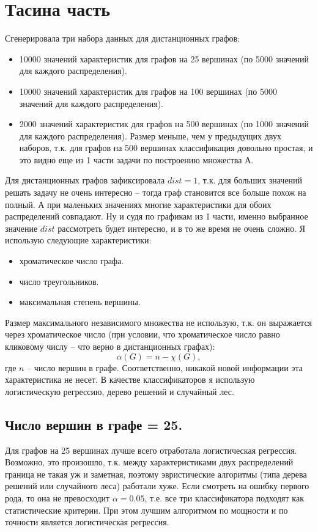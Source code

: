 \documentclass{report}
\begin{document}
\chapter{Тасина часть}
Сгенерировала три набора данных для дистанционных графов:
\begin{itemize}
    \item 10000 значений характеристик для графов на 25 вершинах (по 5000 значений для каждого распределения).
    \item 10000 значений характеристик для графов на 100 вершинах (по 5000 значений для каждого распределения).
    \item 2000 значений характеристик для графов на 500 вершинах (по 1000 значений для каждого распределения). Размер меньше, чем у предыдущих двух наборов, т.к. для графов на 500 вершинах классификация довольно простая, и это видно еще из 1 части задачи по построению множества А.
\end{itemize}
Для дистанционных графов зафиксировала $dist = 1$, т.к. для больших значений решать задачу не очень интересно -- тогда граф становится все больше похож на полный. А при маленьких значениях многие характеристики для обоих распределений совпадают. Ну и судя по графикам из 1 части, именно выбранное значение $dist$ рассмотреть будет интересно, и в то же время не очень сложно.
\newline
\newline
Я использую следующие характеристики:
\begin{itemize}
    \item хроматическое число графа.
    \item число треугольников.
    \item максимальная степень вершины.
\end{itemize}
Размер максимального независимого множества не использую, т.к. он выражается через хроматическое число (при условии, что хроматическое число равно кликовому числу -- что верно в дистанционных графах): 
$$\alpha(G) = n - \chi(G),$$
где $n$ -- число вершин в графе. Соответственно, никакой новой информации эта характеристика не несет.
\newline
\newline
В качестве классификаторов я использую логистическую регрессию, дерево решений и случайный лес.

\section{Число вершин в графе = 25.}
Для графов на 25 вершинах лучше всего отработала логистическая регрессия. Возможно, это произошло, т.к. между характеристиками двух распределений граница не такая уж и заметная, поэтому эвристические алгоритмы (типа дерева решений или случайного леса) работали хуже. 
\newline
\newline
Если смотреть на ошибку первого рода, то она не превосходит $\alpha = 0.05$, т.е. все три классификатора подходят как статистические критерии.
\newline
\newline
При этом лучшим алгоритмом по мощности и по точности является логистическая регрессия.
\end{document}
